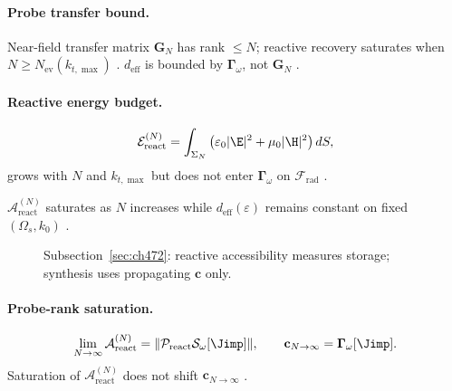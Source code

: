 \paragraph{Probe transfer bound.}
Near-field transfer matrix \(\mathbf{G}_{N}\) has rank \(\le N\); reactive recovery saturates when \(N\ge N_{\mathrm{ev}}(k_{t,\max})\)
\cite{harrington2001,devaney2004}. \(d_{\mathrm{eff}}\) is bounded by \(\boldsymbol{\Gamma}_\omega\), not \(\mathbf{G}_{N}\) \cite{stratton1941,hansen1988}.

\paragraph{Reactive energy budget.}
\begin{equation}
\label{eq:ch4.reactive-energy-budget}
\mathcal{E}_{\mathrm{react}}^{(N)}=\int_{\Sigma_{N}}\big(\varepsilon_{0}|\E|^{2}+\mu_{0}|\H|^{2}\big)\,dS,
\end{equation}
grows with \(N\) and \(k_{t,\max}\) but does not enter \(\boldsymbol{\Gamma}_\omega\) on \(\mathcal{F}_{\mathrm{rad}}\) \cite{jackson1999,stratton1941,harrington2001,devaney2004}.

\begin{lemma}
\label{lem:ch4.probe-sat-lemma}
\(\mathcal{A}_{\mathrm{react}}^{(N)}\) saturates as \(N\) increases while \(d_{\mathrm{eff}}(\varepsilon)\) remains constant on fixed \((\Omega_{s},k_{0})\)
\cite{harrington2001,devaney2004,hansen1988,stratton1941}.
\end{lemma}

\begin{figure}[t]
\centering
{}
\caption{Subsection~\ref{sec:ch472}: reactive accessibility measures storage; synthesis uses propagating \(\mathbf{c}\) only.}
\label{fig:ch4.reactive-accessibility-split}
\end{figure}

\paragraph{Probe-rank saturation.}
\begin{equation}
\label{eq:ch4.probe-saturation}
\lim_{N\to\infty}\mathcal{A}_{\mathrm{react}}^{(N)}=\|\mathcal{P}_{\mathrm{react}}\mathcal{S}_\omega[\Jimp]\|,\qquad
\mathbf{c}_{N\to\infty}=\boldsymbol{\Gamma}_\omega[\Jimp].
\end{equation}
Saturation of \(\mathcal{A}_{\mathrm{react}}^{(N)}\) does not shift \(\mathbf{c}_{N\to\infty}\) \cite{stratton1941,harrington2001,devaney2004}.

